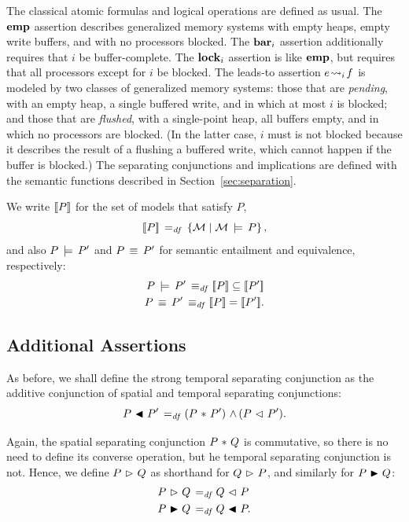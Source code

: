 \documentclass[11pt]{report}
\begin{document}
The classical atomic formulas and logical operations are defined as usual. The $\mathbf{emp}$ assertion describes generalized memory systems with empty heaps, empty write buffers, and with no processors blocked. The $\mathbf{bar}_{i}$ assertion additionally requires that $i$ be buffer-complete. The $\mathbf{lock}_{i}$ assertion is like $\mathbf{emp}$, but requires that all processors except for $i$ be blocked. The leads-to assertion $e \!\leadsto_{i}\! f$ is modeled by two classes of generalized memory systems: those that are \emph{pending}, with an empty heap, a single buffered write, and in which at most $i$ is blocked; and those that are \emph{flushed}, with a single-point heap, all buffers empty, and in which no processors are blocked. (In the latter case, $i$ must is not blocked because it describes the result of a flushing a buffered write, which cannot happen if the buffer is blocked.) The separating conjunctions and implications are defined with the semantic functions described in Section~\ref{sec:separation}.  

We write $[\![P]\!]$ for the set of models that satisfy $P$,\[ [\![P]\!] \operatorname{\;=_{\mathit{df}}\;} \left\lbrace \mathcal{M} \mid \mathcal{M} \,\models\, P \right\rbrace,\] and also $P \,\models\, P'$ and $P \,\equiv\, P'$ for semantic entailment and equivalence, respectively: \begin{align*}
	P \sentails P' \iffdef \pred{P} \subseteq \pred{P'} \\
	P \sequiv P' \iffdef \pred{P} = \pred{P'}.
\end{align*} 


\subsection{Additional Assertions} 

As before, we shall define the strong temporal separating conjunction as the additive conjunction of spatial and temporal separating conjunctions: \[ P \operatorname{\,\blacktriangleleft\,} P' \operatorname{\;=_{\mathit{df}}\;} (P \operatorname{\,\ast\,} P') \operatorname{\,\wedge\,} (P \operatorname{\,\vartriangleleft\,} P').\]

Again, the spatial separating conjunction $P \operatorname{\,\ast\,} Q$ is commutative, so there is no need to define its converse operation, but he temporal separating conjunction is not. Hence, we define $P \operatorname{\,\vartriangleright\,} Q$ as shorthand for $Q \operatorname{\,\vartriangleright\,} P$, and similarly for $P \operatorname{\,\blacktriangleright\,} Q$: \begin{align*}
  P \operatorname{\,\vartriangleright\,} Q \operatorname{\;=_{\mathit{df}}\;} & Q \operatorname{\,\vartriangleleft\,} P \\ 
  P \operatorname{\,\blacktriangleright\,} Q \operatorname{\;=_{\mathit{df}}\;} & Q \operatorname{\,\blacktriangleleft\,} P. \\ 
\end{align*}
\end{document}
